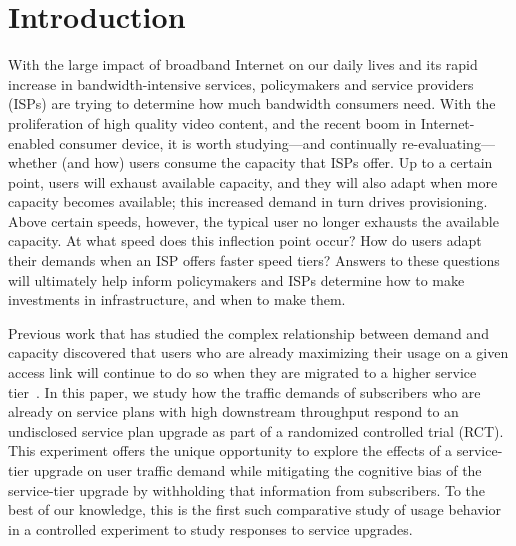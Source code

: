 \section{Introduction}\label{sec:introduction}

With the large impact of broadband Internet on our daily lives and its
rapid increase in bandwidth-intensive services, policymakers and service
providers (ISPs) are trying to determine how much bandwidth consumers
need. With the proliferation of high quality video content, and the
recent boom in Internet-enabled consumer device, it is worth
studying---and continually re-evaluating---whether (and how) users
consume the capacity that ISPs offer.  Up to a certain point, users will
exhaust available capacity, and they will also adapt when more capacity
becomes available; this increased demand in turn drives provisioning.
Above certain speeds, however, the typical user no longer exhausts the
available capacity. At what speed does this inflection point occur?  How
do users adapt their demands when an ISP offers faster speed tiers?
Answers to these questions will ultimately help inform policymakers and
ISPs determine how to make investments in infrastructure, and when to
make them.


Previous work that has studied the complex relationship between demand and capacity  
discovered that users who are already maximizing their usage on a given access link 
will continue to do so when they are migrated to a higher service
tier~\cite{dasu-imc2014}. In this paper, we study how the traffic demands of subscribers who are already 
on service plans with high downstream throughput respond to 
an undisclosed service plan upgrade as part of a randomized controlled trial 
(RCT). This experiment offers the unique opportunity to explore the
effects of a service-tier upgrade on 
user traffic demand while mitigating the cognitive bias of the service-tier upgrade 
by withholding that information from subscribers. To the best of our knowledge, 
this is the first such comparative study of usage behavior in a controlled 
experiment to study responses to service upgrades.

